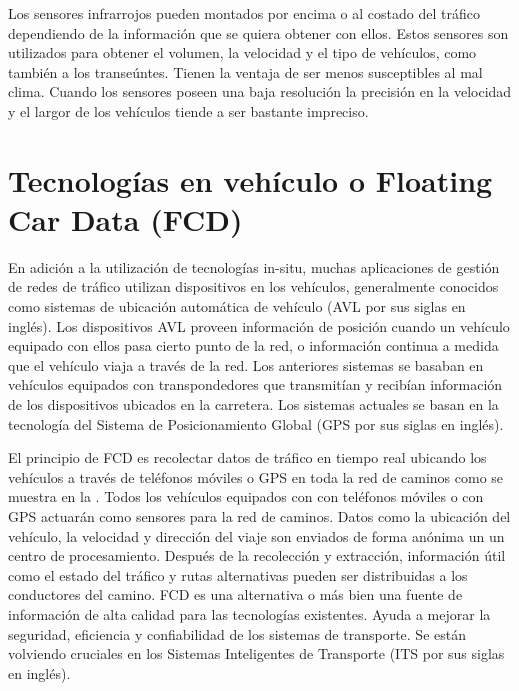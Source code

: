 Los sensores infrarrojos pueden montados por encima o al costado del tráfico dependiendo de la información que se quiera obtener con ellos. Estos sensores son utilizados para obtener el volumen, la velocidad y el tipo de vehículos, como también a los transeúntes. Tienen la ventaja de ser menos susceptibles al mal clima. Cuando los sensores poseen una baja resolución la precisión en la velocidad y el largor de los vehículos tiende a ser bastante impreciso.

\section{Tecnologías en vehículo o Floating Car Data (FCD)}

En adición a la utilización de tecnologías in-situ, muchas aplicaciones de gestión de redes de tráfico utilizan dispositivos en los vehículos, generalmente conocidos como sistemas de ubicación automática de vehículo (AVL por sus siglas en inglés). Los dispositivos AVL proveen información de posición cuando un vehículo equipado con ellos pasa cierto punto de la red, o información continua a medida que el vehículo viaja a través de la red. Los anteriores sistemas se basaban en vehículos equipados con transpondedores que transmitían y recibían información de los dispositivos ubicados en la carretera. Los sistemas actuales se basan en la tecnología del Sistema de Posicionamiento Global (GPS por sus siglas en inglés).

El principio de FCD es recolectar datos de tráfico en tiempo real ubicando los vehículos a través de teléfonos móviles o GPS en toda la red de caminos como se muestra en la . Todos los vehículos equipados con con teléfonos móviles o con GPS actuarán como sensores para la red de caminos. Datos como la ubicación del vehículo, la velocidad y dirección del viaje son enviados de forma anónima un un centro de procesamiento. Después de la recolección y extracción, información útil como el estado del tráfico y rutas alternativas pueden ser distribuidas a los conductores del camino. FCD es una alternativa o más bien una fuente de información de alta calidad para las tecnologías existentes. Ayuda a mejorar la seguridad, eficiencia y confiabilidad de los sistemas de transporte. Se están volviendo cruciales en los Sistemas Inteligentes de Transporte (ITS por sus siglas en inglés).

